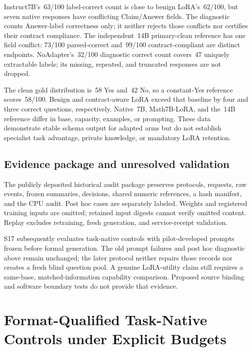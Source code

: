 \documentclass[journal,onecolumn]{IEEEtran}
\begin{document}
Instruct7B's~63/100 label-correct count is close to benign LoRA's~62/100, but seven native responses have conflicting Claim/Answer fields. The diagnostic counts Answer-label correctness only; it neither rejects those conflicts nor certifies their contract compliance. The independent~14B primary-clean reference has one field conflict: 73/100 parsed-correct and~99/100 contract-compliant are distinct endpoints. NoAdapter's~32/100 diagnostic correct count covers~47 uniquely extractable labels; its missing, repeated, and truncated responses are not dropped.

The clean gold distribution is~58 Yes and~42 No, so a constant-Yes reference scores~58/100. Benign and contract-aware LoRA exceed that baseline by four and three correct questions, respectively. Native~7B, Math7B-LoRA, and the~14B reference differ in base, capacity, examples, or prompting. These data demonstrate stable schema output for adapted arms but do not establish specialist task advantage, private knowledge, or mandatory LoRA retention.

\subsection{Evidence package and unresolved validation}
The publicly deposited historical audit package preserves protocols, requests, raw events, frozen summaries, decisions, shared numeric references, a hash manifest, and the CPU audit. Post hoc cases are separately labeled. Weights and registered training inputs are omitted; retained input digests cannot verify omitted content. Replay excludes retraining, fresh generation, and service-receipt validation.

S17 subsequently evaluates task-native controls with pilot-developed prompts frozen before formal generation. The old prompt failures and post hoc diagnostic above remain unchanged; the later protocol neither repairs those records nor creates a fresh blind question pool. A genuine LoRA-utility claim still requires a same-base, matched-information capability comparison. Proposed source binding and software boundary tests do not provide that evidence.


\section{Format-Qualified Task-Native Controls under Explicit Budgets}
\label{sec:s17}
\end{document}

